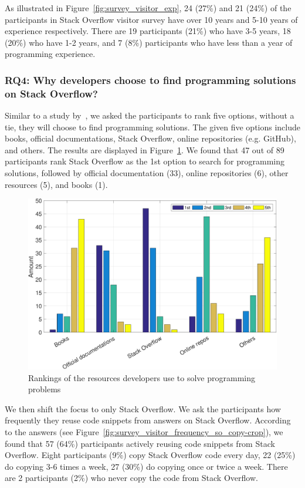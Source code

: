 \documentclass{svjour3}                     %
\begin{document}
As illustrated in Figure~\ref{fig:survey_visitor_exp}, 24 (27\%) and 21 (24\%)
of the participants in Stack Overflow visitor survey have over 10 years and 5-10
years of experience respectively. There are 19 participants (21\%) who have 3-5
years, 18 (20\%) who have 1-2 years, and 7 (8\%) participants who have less than a
year of programming experience.

\subsubsection*{RQ4: Why developers choose to find programming solutions on Stack Overflow?}

Similar to a study by~\cite{Acar2016}, we asked the participants to rank five
options, without a tie, they will choose to find programming solutions. The
given five options include books, official documentations, Stack Overflow,
online repositories (e.g. GitHub), and others. The results are displayed in
Figure~\ref{fig:survey_visitor_rankings-crop}. We found that 47 out of 89
participants rank Stack Overflow as the 1st option to search for programming
solutions, followed by official documentation (33), online repositories (6),
other resources (5), and books (1).

\begin{figure} \centering
	\includegraphics[width=.5\linewidth]{survey_visitor_rankings-crop} 
	\caption{Rankings of the resources developers use to solve programming problems}
	\label{fig:survey_visitor_rankings-crop} 
\end{figure}

We then shift the focus to only Stack Overflow. We ask the participants how
frequently they reuse code snippets from answers on Stack Overflow. According to
the answers (see Figure~\ref{fig:survey_visitor_frequency_so_copy-crop}), we
found that 57 (64\%) participants actively reusing code snippets from Stack
Overflow. Eight participants (9\%) copy Stack Overflow code every day, 22 (25\%)
do copying 3-6 times a week, 27 (30\%) do copying once or twice a week. There
are 2 participants (2\%) who never copy the code from Stack Overflow.
\end{document}
